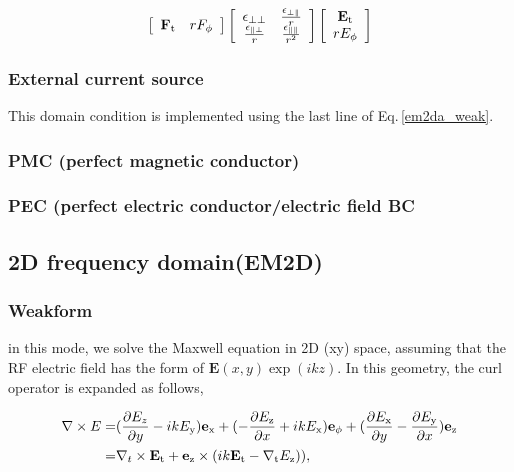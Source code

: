 \documentclass[11pt,a4paper,final]{report}
\begin{document}
 \begin{equation}
 \left[ {\begin{array}{*{20}c}
\mathbf{F}_{\rm t}  & rF_{\rm \phi}\\
\end{array}}\right]
\left[ {\begin{array}{*{20}c}
\mathbf{\epsilon}_{\perp \perp}  & \frac{\mathbf{\epsilon}_{\perp \parallel}}{r}\\
\frac{\mathbf{\epsilon}_{\parallel \perp}}{r} & \frac{\mathbf{\epsilon}_{\parallel \parallel}}{r^2}\\
\end{array}}\right]
 \left[ {\begin{array}{*{20}c}
\mathbf{E}_{\rm t}  \\
rE_{\rm \phi}\\
\end{array}}\right]
\label{em2da_anisotropic}
\end{equation}

 \subsubsection{External current source}
 This domain condition is implemented using the last line of Eq.\,\ref{em2da_weak}. 
 
 \subsubsection{PMC (perfect magnetic conductor)}
 
 \subsubsection{PEC (perfect electric conductor/electric field BC}
  
\subsection{2D frequency domain(EM2D)}
\subsubsection{Weakform}
in this mode, we solve the Maxwell equation in 2D (xy) space, assuming that the RF electric field has the form of $\mathbf{E}(x, y) \exp{(ikz)}$. 
In this geometry, the curl operator is expanded as follows,

 \begin{align}
 \nabla \times E = &(\frac{\partial E_{z}}{\partial y}- ik E_{\rm y} )\mathbf{e}_{\rm x} +
( -\frac{\partial E_{\rm z}}{\partial x} + ik E_{\rm x})\mathbf{e}_{\rm \phi}+
( \frac{\partial E_{\rm x}}{\partial y} - \frac{\partial E_{\rm y}}{\partial x})\mathbf{e}_{\rm z} 
 \notag \\ 
 = &\nabla_{t} \times \mathbf{E}_{\rm t} + \mathbf{e}_{\rm z} \times (ik \mathbf{E}_{\rm t} - \nabla_{\rm t} E_{\rm z}) ),
 \end{align}
\end{document}
